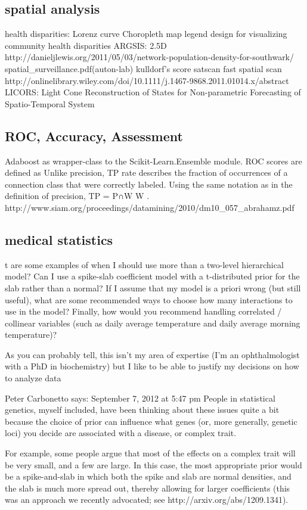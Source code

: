 \documentclass[12pt]{article}
\begin{document}
\subsection*{spatial analysis}
health disparities: Lorenz curve
Choropleth map legend design for visualizing community health disparities
ARGSIS: 2.5D http://danieljlewis.org/2011/05/03/network-population-density-for-southwark/
spatial\_surveillance.pdf(auton-lab)
kulldorf's score satscan
fast spatial scan
http://onlinelibrary.wiley.com/doi/10.1111/j.1467-9868.2011.01014.x/abstract
LICORS: Light Cone Reconstruction of States for Non-parametric Forecasting of Spatio-Temporal System

\subsection*{ROC, Accuracy, Assessment}
Adaboost as wrapper-class to the Scikit-Learn.Ensemble module.  ROC scores are defined as
Unlike precision, TP rate describes the fraction of occurrences of a connection
class that were correctly labeled. Using the same notation as in the definition of
precision, TP = P∩W
W .
http://www.siam.org/proceedings/datamining/2010/dm10_057_abrahamz.pdf


\subsection*{medical statistics}

t are some examples of when I should use more than a two-level hierarchical model? Can I use a spike-slab coefficient model with a t-distributed prior for the slab rather than a normal? If I assume that my model is a priori wrong (but still useful), what are some recommended ways to choose how many interactions to use in the model? Finally, how would you recommend handling correlated / collinear variables (such as daily average temperature and daily average morning temperature)?

As you can probably tell, this isn’t my area of expertise (I’m an ophthalmologist with a PhD in biochemistry) but I like to be able to justify my decisions on how to analyze data

Peter Carbonetto says:
September 7, 2012 at 5:47 pm
People in statistical genetics, myself included, have been thinking about these issues quite a bit because the choice of prior can influence what genes (or, more generally, genetic loci) you decide are associated with a disease, or complex trait.

For example, some people argue that most of the effects on a complex trait will be very small, and a few are large. In this case, the most appropriate prior would be a spike-and-slab in which both the spike and slab are normal densities, and the slab is much more spread out, thereby allowing for larger coefficients (this was an approach we recently advocated; see http://arxiv.org/abs/1209.1341).
\end{document}
